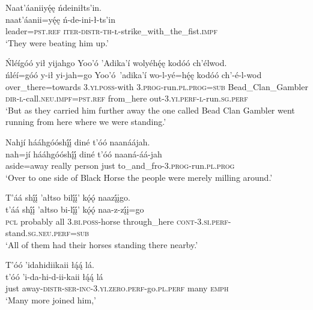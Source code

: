 \ea\label{ex:text1-43-5}
Naat’áaniiyę́ę ńdeiniłts’in.\\
\gll naat’áanii=yę́ę	ń-de-ini-ł-ts’in\\
     leader=\textsc{pst}.\textsc{ref}	\textsc{iter}-\textsc{distr}-\textsc{th}-\textsc{ł}-strike\_with\_the\_fist.\textsc{impf}\\
\glt `They were beating him up.'
\z

\ea\label{ex:text1-43-6}
Ńléígóó yił yijahgo Yoo’ó ’Adika’í wolyéhę́ę kodóó ch’élwod.\\
\gll ńléí=góó	y-ił	yi-jah=go	Yoo’ó~{’adika’í}	wo-l-yé=hę́ę	kodóó	ch’-é-l-wod\\
     over\_there=towards	3.\textsc{yi}.\textsc{poss}-with	3.\textsc{prog}-run.\textsc{pl}.\textsc{prog}=\textsc{sub}	Bead\_Clan\_Gambler	\textsc{dir}-\textsc{l}-call.\textsc{neu}.\textsc{impf}=\textsc{pst}.\textsc{ref}	from\_here	out-3.\textsc{yi}.\textsc{perf}-\textsc{l}-run.\textsc{sg}.\textsc{perf}\\
\glt `But as they carried him further away the one called Bead Clan Gambler went running from here where we were standing.'
\z

\newpage
\ea\label{ex:text1-44-1}
Nahjí hááhgóóshį́į́ diné t’óó naanáájah.\\
\gll nah=jí	hááhgóóshį́į́	diné	t’óó	naaná-áá-jah\\
     aside=away	really	person	just	to\_and\_fro-3.\textsc{prog}-run.\textsc{pl}.\textsc{prog}\\
\glt `Over to one side of Black Horse the people were merely milling around.'
\z

\ea\label{ex:text1-44-2}
T’áá shį́į́ ’ałtso bilį́į́’ kǫ́ǫ́ naazį́įgo.\\
\gll t’áá	shį́į́	’ałtso	bi-lį́į́’	kǫ́ǫ́	naa-z-zį́į=go\\
     \textsc{pcl}	probably	all	3.\textsc{bi}.\textsc{poss}-horse	through\_here	\textsc{cont}-3.\textsc{si}.\textsc{perf}-stand.\textsc{sg}.\textsc{neu}.\textsc{perf}=\textsc{sub}\\
\glt `All of them had their horses standing there nearby.'
\z

\ea\label{ex:text1-44-3}
T’óó ’idahidiikaii łą́ą́ lá.\\
\gll t’óó	’i-da-hi-d-ii-kaii	łą́ą́	lá\\
     just	away-\textsc{distr}-\textsc{ser}-\textsc{inc}-3.\textsc{yi}.\textsc{zero}.\textsc{perf}-go.\textsc{pl}.\textsc{perf}	many	\textsc{emph}\\
\glt `Many more joined him,'
\z

